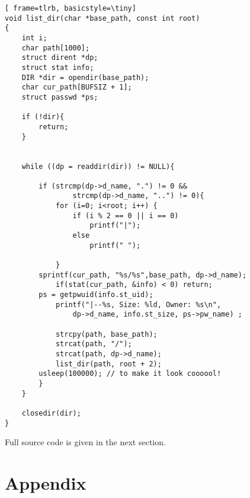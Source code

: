 \documentclass[11pt]{article}
\begin{document}
\vspace{5mm}
\begin{minipage}{1\textwidth}
\begin{lstlisting}[ frame=tlrb, basicstyle=\tiny]
void list_dir(char *base_path, const int root)
{
    int i;
    char path[1000];
    struct dirent *dp;
    struct stat info;
    DIR *dir = opendir(base_path);
    char cur_path[BUFSIZ + 1];
    struct passwd *ps;

    if (!dir){
        return;
    }


    while ((dp = readdir(dir)) != NULL){
    
        if (strcmp(dp->d_name, ".") != 0 && 
        		strcmp(dp->d_name, "..") != 0){
            for (i=0; i<root; i++) {
                if (i % 2 == 0 || i == 0)
                    printf("|");
                else
                    printf(" ");

            }   
        sprintf(cur_path, "%s/%s",base_path, dp->d_name);
            if(stat(cur_path, &info) < 0) return;
        ps = getpwuid(info.st_uid);
            printf("|--%s, Size: %ld, Owner: %s\n", 
            	dp->d_name, info.st_size, ps->pw_name) ;

            strcpy(path, base_path);
            strcat(path, "/");
            strcat(path, dp->d_name);
            list_dir(path, root + 2);
        usleep(100000); // to make it look coooool!
        }
    }

    closedir(dir);
}
\end{lstlisting}
\end{minipage}

Full source code is given in the next section.

\newpage
\section*{Appendix}

\thispagestyle{empty}
\end{document}
